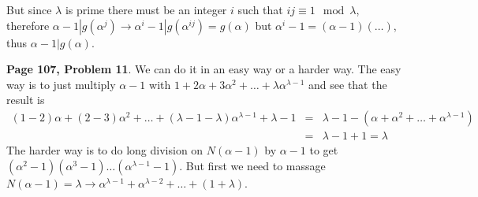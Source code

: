 \documentclass[aps,preprint,preprintnumbers,nofootinbib,showpacs,prd]{revtex4-1}
\newcommand{\nbea}{\begin{eqnarray*}}
\newcommand{\neea}{\end{eqnarray*}}
\begin{document}
But since $\lambda$ is prime there must be an integer $i$ such that $ij \equiv 1 \mod{\lambda}$, therefore $\alpha - 1|g(\alpha^j) \to \alpha^i - 1 | g(\alpha^{ij}) = g(\alpha)$ but $\alpha^i - 1 = (\alpha - 1)(\dots)$, thus $\alpha - 1|g(\alpha)$.

{\bf Page 107, Problem 11}. We can do it in an easy way or a harder way. The easy way is to just multiply $\alpha - 1$ with $1 + 2\alpha + 3\alpha^2 + \dots + \lambda \alpha^{\lambda - 1}$ and see that the result is
%
\nbea
(1-2) \alpha + (2-3)\alpha^2 + \dots + (\lambda - 1 - \lambda)\alpha^{\lambda - 1} + \lambda - 1 & = & \lambda - 1 - (\alpha + \alpha^2 + \dots + \alpha^{\lambda - 1}) \\
& = & \lambda - 1 + 1 = \lambda
\neea
%
The harder way is to do long division on $N(\alpha - 1)$ by $\alpha - 1$ to get $(\alpha^2 - 1)(\alpha^3 - 1) \dots (\alpha^{\lambda - 1} - 1)$. But first we need to massage $N(\alpha - 1) = \lambda \to \alpha^{\lambda-1} + \alpha^{\lambda - 2} + \dots + (1 + \lambda)$.
\end{document}
